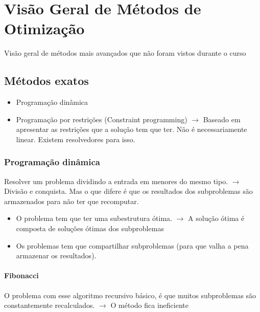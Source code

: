 \chapter{Visão Geral de Métodos de Otimização}

Visão geral de métodos mais avançados que não foram vistos durante o curso

\section{Métodos exatos}

\begin{itemize}
	\item Programação dinâmica
	\item Programação por restrições (Constraint programming) $\rightarrow$ Baseado em apresentar as restrições que a solução tem que ter. Não é necessariamente linear. Existem resolvedores para isso.
\end{itemize}

\subsection{Programação dinâmica}

Resolver um problema dividindo a entrada em menores do mesmo tipo. $\rightarrow$ Divisão e conquista. Mas o que difere é que os resultados dos subproblemas são armazenados para não ter que recomputar.

\begin{itemize}
	\item O problema tem que ter uma subestrutura ótima. $\rightarrow$ A solução ótima é composta de soluções ótimas dos subproblemas
	\item Os problemas tem que compartilhar subproblemas (para que valha a pena armazenar os resultados).
\end{itemize}

\subsubsection{Fibonacci}

\begin{algorithm}
	\SetAlgoLined
\end{algorithm}

O problema com esse algoritmo recursivo básico, é que muitos subproblemas são constantemente recalculados. $\rightarrow$ O método fica ineficiente

